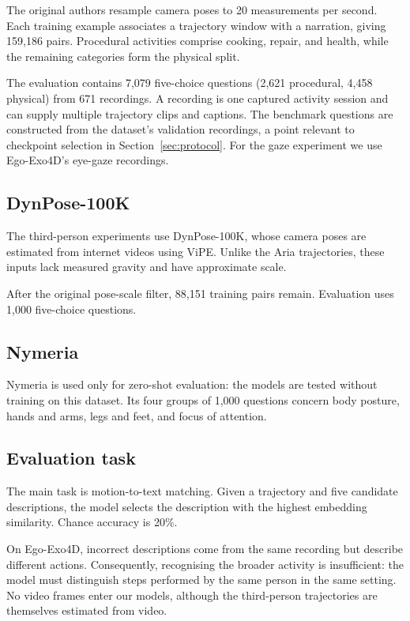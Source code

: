 \documentclass[10pt,twocolumn,letterpaper]{article}
\begin{document}
The original authors resample camera poses to 20 measurements per second. Each training example associates a
trajectory window with a narration, giving 159,186 pairs. Procedural activities comprise cooking, repair, and
health, while the remaining categories form the physical split.

The evaluation contains 7,079 five-choice questions (2,621 procedural, 4,458 physical) from 671 recordings. A
recording is one captured activity session and can supply multiple trajectory clips and captions. The benchmark
questions are constructed from the dataset's validation recordings, a point relevant to checkpoint selection in
Section~\ref{sec:protocol}. For the gaze experiment we use Ego-Exo4D's eye-gaze recordings.

\subsection{DynPose-100K}
The third-person experiments use DynPose-100K, whose camera poses are estimated from internet videos using ViPE.
Unlike the Aria trajectories, these inputs lack measured gravity and have approximate scale.

After the original pose-scale filter, 88,151 training pairs remain. Evaluation uses 1,000 five-choice questions.

\subsection{Nymeria}
Nymeria is used only for zero-shot evaluation: the models are tested without training on this dataset. Its four
groups of 1,000 questions concern body posture, hands and arms, legs and feet, and focus of attention.

\subsection{Evaluation task}
The main task is motion-to-text matching. Given a trajectory and five candidate descriptions, the model selects the
description with the highest embedding similarity. Chance accuracy is 20\%.

On Ego-Exo4D, incorrect descriptions come from the same recording but describe different actions. Consequently,
recognising the broader activity is insufficient: the model must distinguish steps performed by the same person in
the same setting.
No video frames enter our models, although the third-person trajectories are themselves estimated from video.
\end{document}
